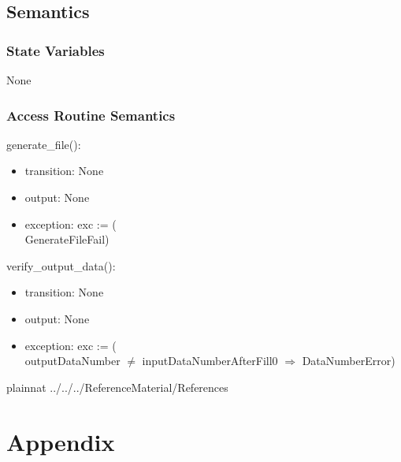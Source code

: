 \documentclass[12pt, titlepage]{article}
\begin{document}
\subsection{Semantics}

\subsubsection{State Variables}
None


\subsubsection{Access Routine Semantics}

generate\_file():

\begin{itemize}
\item transition: None
\item output:  None
\item exception: exc := (\\
GenerateFileFail)
\end{itemize}
verify\_output\_data():
\begin{itemize}
\item transition: None
\item output:  None
\item exception: exc := (\\
outputDataNumber $\neq$ inputDataNumberAfterFill0 $\Rightarrow$ DataNumberError)
\end{itemize}


\newpage

 {plainnat}
 {../../../ReferenceMaterial/References}


\newpage

\section{Appendix} \label{Appendix}


\end{document}
